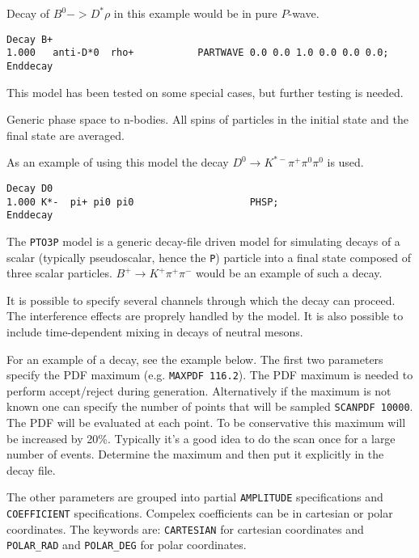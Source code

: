 \Example
Decay of $B^0->D^*\rho$ in this example would be in pure $P$-wave.
\begin{verbatim}
Decay B+
1.000   anti-D*0  rho+           PARTWAVE 0.0 0.0 1.0 0.0 0.0 0.0;
Enddecay
\end{verbatim}

\Notes
This model has been tested on
some special cases, but further testing is needed.






\label{phsp}



\Expl
Generic phase space to n-bodies. All spins of particles in
the initial state and the final state are averaged.

\Example
As an example of using this model the decay 
$D^0\rightarrow K^{*-}\pi^+\pi^0\pi^0$
is used.
\begin{verbatim}
Decay D0
1.000 K*-  pi+ pi0 pi0                    PHSP;
Enddecay
\end{verbatim}

\label{pto3p}

The \texttt{PTO3P} model is a generic decay-file driven model for simulating 
decays of a scalar (typically pseudoscalar, hence the \texttt{P}) particle
into a final state composed of three scalar particles. $B^+\to K^+\pi^+\pi^-$
would be an example of such a decay.

It is possible to specify several channels through which the decay can proceed.
The interference effects are proprely handled by the model. It is also possible
to include time-dependent mixing in decays of neutral mesons.

\Expl
For an example of a decay, see the example below.
The first two parameters specify the PDF maximum (e.g. \texttt{MAXPDF 116.2}).
The PDF maximum is needed to perform accept/reject during generation. 
Alternatively if the maximum is not known one can specify the number of points
that will be sampled \texttt{SCANPDF 10000}. The PDF will be evaluated at each
point. To be conservative this maximum will be increased by 20\%. Typically
it's a good idea to do the scan once for a large number of events. Determine
the maximum and then put it explicitly in the decay file.

The other parameters are grouped into partial \texttt{AMPLITUDE} specifications and 
\texttt{COEFFICIENT} specifications. Compelex coefficients can be in cartesian 
or polar coordinates. The keywords are: \texttt{CARTESIAN} for 
cartesian coordinates and \texttt{POLAR\_RAD} and \texttt{POLAR\_DEG} for polar coordinates.   


